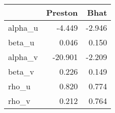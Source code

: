 
\begin{tabular}{l|r|r}
\hline
  & Preston & Bhat\\
\hline
alpha\_u & -4.449 & -2.946\\
\hline
beta\_u & 0.046 & 0.150\\
\hline
alpha\_v & -20.901 & -2.209\\
\hline
beta\_v & 0.226 & 0.149\\
\hline
rho\_u & 0.820 & 0.774\\
\hline
rho\_v & 0.212 & 0.764\\
\hline
\end{tabular}
